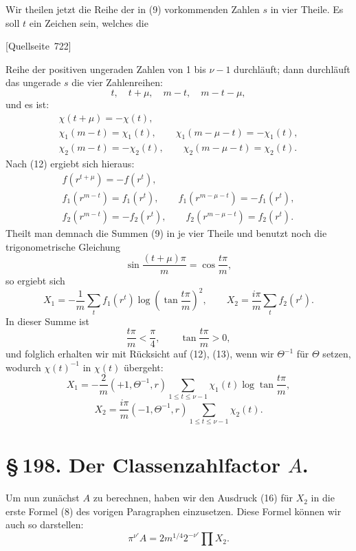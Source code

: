 \documentclass[11pt]{article}
\newcommand{\srcpage}[1]{\par\medskip\noindent\textsf{[Quellseite~#1]}\par\smallskip}
\begin{document}
Wir theilen jetzt die Reihe der in (9) vorkommenden Zahlen $s$ in vier Theile. Es soll $t$ ein Zeichen sein, welches die
\srcpage{722}
Reihe der positiven ungeraden Zahlen von 1 bis $\nu-1$ durchläuft; dann durchläuft das ungerade $s$ die vier Zahlenreihen:
\[
t,
\quad t+\mu,
\quad m-t,
\quad m-t-\mu,
\]
und es ist:
\[
\begin{gathered}
\chi(t+\mu)=-\chi(t),\\
\chi_1(m-t)=\chi_1(t),\qquad \chi_1(m-\mu-t)=-\chi_1(t),\\
\chi_2(m-t)=-\chi_2(t),\qquad \chi_2(m-\mu-t)=\chi_2(t).
\end{gathered}
\]
Nach (12) ergiebt sich hieraus:
\[
\begin{gathered}
f(r^{t+\mu})=-f(r^t),\\
f_1(r^{m-t})=f_1(r^t),\qquad f_1(r^{m-\mu-t})=-f_1(r^t),\\
f_2(r^{m-t})=-f_2(r^t),\qquad f_2(r^{m-\mu-t})=f_2(r^t).
\end{gathered}
\]
Theilt man demnach die Summen (9) in je vier Theile und benutzt noch die trigonometrische Gleichung
\[
\sin\frac{(t+\mu)\pi}{m}=\cos\frac{t\pi}{m},
\]
so ergiebt sich
\[
X_1=-\frac1m\sum_t f_1(r^t)\log\left(\tan\frac{t\pi}{m}\right)^2,
\qquad
X_2=\frac{i\pi}{m}\sum_t f_2(r^t).
\]
In dieser Summe ist
\[
\frac{t\pi}{m}<\frac\pi4,
\qquad
\tan\frac{t\pi}{m}>0,
\]
und folglich erhalten wir mit Rücksicht auf (12), (13), wenn wir $\Theta^{-1}$ für $\Theta$ setzen, wodurch $\chi(t)^{-1}$ in $\chi(t)$ übergeht:
\begin{equation}
X_1=-\frac2m(+1,\Theta^{-1},r)
\sum_{1\le t\le\nu-1}\chi_1(t)\log\tan\frac{t\pi}{m},
\tag{15}
\end{equation}
\begin{equation}
X_2=\frac{i\pi}{m}(-1,\Theta^{-1},r)
\sum_{1\le t\le\nu-1}\chi_2(t).
\tag{16}
\end{equation}

\section*{\S\,198. Der Classenzahlfactor $A$.}

Um nun zunächst $A$ zu berechnen, haben wir den Ausdruck (16) für $X_2$ in die erste Formel (8) des vorigen Paragraphen einzusetzen. Diese Formel können wir auch so darstellen:
\begin{equation}
\pi^{\nu'}A=2m^{1/4}2^{-\nu'}\prod X_2.
\tag{1}
\end{equation}
\end{document}
